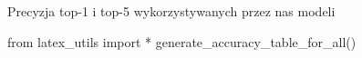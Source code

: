 \documentclass[
    left=2.5cm,         %
    right=2.5cm,        %
    top=2.5cm,          %
    bottom=3cm,         %
    bindingoffset=6mm,  %
    nohyphenation=false %
]{eiti/eiti-thesis}
\begin{document}

\begin{table}[ht]
\centering
\caption{Precyzja top-1 i top-5 wykorzystywanych przez nas modeli}
\begin{adjustbox}{max width=\textwidth}
\begin{pycode}
from latex_utils import *
generate_accuracy_table_for_all()
\end{pycode}
\end{adjustbox}
\end{table}
\newpage
\end{document}
